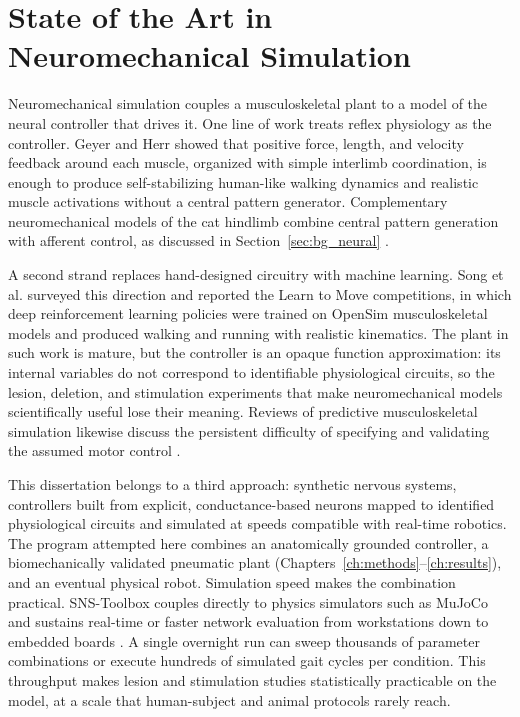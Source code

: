 
\section{State of the Art in Neuromechanical Simulation}\label{sec:bg_sota}

Neuromechanical simulation couples a musculoskeletal plant to a model of the
neural controller that drives it. One line of work treats reflex physiology as
the controller. Geyer and Herr \citep{geyer_musclereflex_2010} showed that
positive force, length, and velocity feedback around each muscle, organized with
simple interlimb coordination, is enough to produce self-stabilizing human-like
walking dynamics and realistic muscle activations without a central pattern
generator. Complementary neuromechanical models of the cat hindlimb combine
central pattern generation with afferent control, as discussed in
Section~\ref{sec:bg_neural} \citep{markin_afferent_2010, shevtsova_modeling_2016}.

A second strand replaces hand-designed circuitry with machine learning. Song et
al. \citep{song_deep_2021} surveyed this direction and reported the Learn to
Move competitions, in which deep reinforcement learning policies were trained on
OpenSim musculoskeletal models and produced walking and running with realistic
kinematics. The plant in such work is mature, but the controller is an opaque
function approximation: its internal variables do not correspond to identifiable
physiological circuits, so the lesion, deletion, and stimulation experiments
that make neuromechanical models scientifically useful lose their meaning.
Reviews of predictive musculoskeletal simulation likewise discuss the persistent
difficulty of specifying and validating the assumed motor control
\citep{degroote_perspective_2021}.

This dissertation belongs to a third approach: synthetic nervous systems,
controllers built from explicit, conductance-based neurons mapped to identified
physiological circuits and simulated at speeds compatible with real-time
robotics. The program attempted here combines an anatomically grounded
controller, a biomechanically validated pneumatic plant
(Chapters~\ref{ch:methods}--\ref{ch:results}), and an eventual physical robot.
Simulation speed makes the combination practical. SNS-Toolbox couples directly
to physics simulators such as MuJoCo and sustains real-time or faster network
evaluation from workstations down to embedded boards
\citep{caggiano_myosuite_2022, nourse_sns_2023}. A single overnight run can
sweep thousands of parameter combinations or execute hundreds of simulated gait
cycles per condition. This throughput makes lesion and stimulation studies
statistically practicable on the model, at a scale that human-subject and
animal protocols rarely reach.


